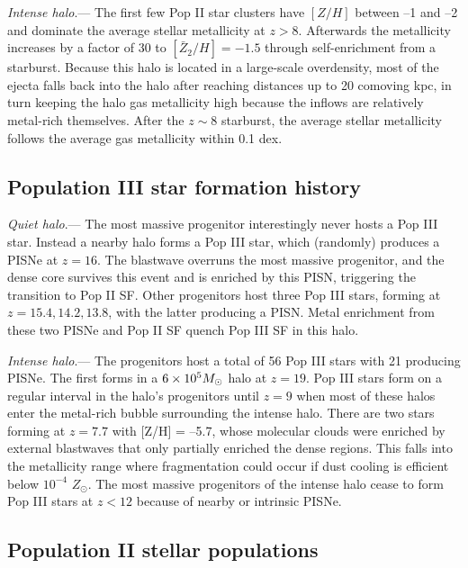 \documentclass[12pt]{article}
\newcommand{\Ms}{\ifmmode{M_\odot}\else{$M_\odot$}\fi}
\newcommand\tento[1]{$10^{#1}$}
\begin{document}
\textit{Intense halo}.--- The first few Pop II star clusters have
$[Z/H]$ between --1 and --2 and dominate the average stellar
metallicity at $z > 8$.  Afterwards the metallicity increases by a
factor of 30 to $[\bar{Z}_2/H] = -1.5$ through self-enrichment from a
starburst.  Because this halo is located in a large-scale overdensity,
most of the ejecta falls back into the halo after reaching distances
up to 20 comoving kpc, in turn keeping the halo gas metallicity high
because the inflows are relatively metal-rich themselves.  After the
$z \sim 8$ starburst, the average stellar metallicity follows the
average gas metallicity within 0.1 dex.

\subsection*{Population III star formation history}

\textit{Quiet halo}.--- The most massive progenitor interestingly
never hosts a Pop III star.  Instead a nearby halo forms a Pop III
star, which (randomly) produces a PISNe at $z=16$.  The blastwave
overruns the most massive progenitor, and the dense core survives this
event and is enriched by this PISN, triggering the transition to Pop
II SF.  Other progenitors host three Pop III stars, forming at $z =
15.4, 14.2, 13.8$, with the latter producing a PISN.  Metal enrichment
from these two PISNe and Pop II SF quench Pop III SF in this halo.

\textit{Intense halo}.--- The progenitors host a total of 56 Pop III
stars with 21 producing PISNe.  The first forms in a $6 \times 10^5
\Ms$ halo at $z=19$.  Pop III stars form on a regular interval in the
halo's progenitors until $z=9$ when most of these halos enter the
metal-rich bubble surrounding the intense halo.  There are two stars
forming at $z=7.7$ with [Z/H] = --5.7, whose molecular clouds were
enriched by external blastwaves that only partially enriched the dense
regions.  This falls into the metallicity range where fragmentation
could occur if dust cooling is efficient below \tento{-4} $Z_\odot$.
The most massive progenitors of the intense halo cease to form Pop III
stars at $z<12$ because of nearby or intrinsic PISNe.

\subsection*{Population II stellar populations}
\label{sec:pop}


\end{document}
